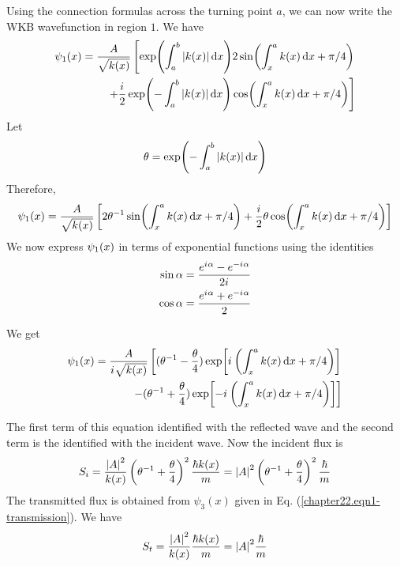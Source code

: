 Using the connection formulas across the turning point $a$, we can now write the WKB wavefunction in region $1$. We have 
\begin{align}
\label{chapter22.eqn6-transmission}
\begin{split}
\psi_1\qty(x) =
\frac{A}{\sqrt{k(x)}} 
\left[
\exp(\int_{a}^{b} \abs{k(x)} \dd{x}) 2 \sin(\int_{x}^{a} k(x) \dd{x} + \pi/4) \right.\\
\left.
+ 
\frac{{i\mkern1mu}}{2} \exp(-\int_{a}^{b} \abs{k(x)}\dd{x}) \cos(\int_{x}^{a}k(x) \dd{x} + \pi/4)
\right]
\end{split}
\end{align}
Let
\begin{equation}
\label{chapter22.eqn7-transmission}
\theta = \exp(-\int_{a}^{b} \abs{k(x)} \dd{x})
\end{equation}
Therefore,
\begin{align}
\label{chapter22.eqn8-transmission}
\psi_1\qty(x) =
\frac{A}{\sqrt{k(x)}} 
\left[
2\theta^{-1} \sin(\int_{x}^{a} k(x) \dd{x} + \pi/4) 
+ 
\frac{{i\mkern1mu}}{2} \theta \cos(\int_{x}^{a}k(x) \dd{x} + \pi/4)
\right]
\end{align}
We now express $\psi_1\qty(x)$ in terms of exponential functions using the identities
\begin{align*}
	\sin\alpha &= \frac{e^{{i\mkern1mu} \alpha} - e^{-{i\mkern1mu} \alpha}}{2{i\mkern1mu}}\\
	\cos\alpha &= \frac{e^{{i\mkern1mu} \alpha} + e^{-{i\mkern1mu} \alpha}}{2}
\end{align*}


We get
\begin{align}
\label{chapter22.eqn9-transmission}
\begin{split}
\psi_1\qty(x) = \frac{A}{{i\mkern1mu} \sqrt{k(x)}} \left[
(\theta^{-1} - \frac{\theta}{4}) \exp[{i\mkern1mu} \left(\int_{x}^{a} k(x) \dd{x} + \pi/4\right)]
\right. 
\\
\left.
- (\theta^{-1} + \frac{\theta}{4}) \exp[-{i\mkern1mu} \left(\int_{x}^{a} k(x) \dd{x} + \pi/4\right)]
\right]
\end{split}
\end{align}


The first term of this equation identified with the reflected wave and  the second term is the identified with the incident wave. Now the incident flux is
\begin{equation}
\label{chapter22.eqn10-transmission}
S_i = \frac{\abs{A}^2}{k(x)} \left(\theta^{-1} + \frac{\theta}{4}\right)^2 \frac{\hbar k(x)}{m} = \abs{A}^2 \left(\theta^{-1} + \frac{\theta}{4}\right)^2 \frac{\hbar}{m}
\end{equation}
The transmitted flux is obtained from $\psi_3(x)$ given in Eq. (\ref{chapter22.eqn1-transmission}). We have
\begin{equation}
\label{chapter22.eqn11-transmission}
S_t  = \frac{\abs{A}^2}{k(x)} \frac{\hbar k(x)}{m} = \abs{A}^2 \frac{\hbar}{m}
\end{equation}

